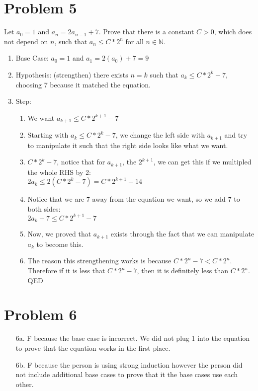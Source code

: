 \documentclass[11pt,letterpaper]{article}
\begin{document}
\section*{Problem 5}
Let $a_0 = 1$ and $a_n = 2a_{n-1} + 7$. Prove that there is a constant $C > 0$, which does not depend on $n$, such that $a_n \leq C * 2^n$ for all $n \in \mathbb{N}$.
\begin{enumerate}
	\item Base Case: $a_0 = 1$ and $a_1 = 2(a_0) + 7 = 9$
	\item Hypothesis: (strengthen) there exists $n = k$ such that $a_k \leq C * 2^k - 7$, choosing 7 because it matched the equation. 
	\item Step: 
	\begin{enumerate}
		\item We want $a_{k+1} \leq C * 2^{k+1} - 7$
		\item Starting with $a_k \leq C * 2^k - 7$, we change the left side with $a_{k+1}$ and try to manipulate it such that the right side looks like what we want.
		\item $C * 2^{k} - 7$, notice that for $a_{k+1}$, the $2^{k+1}$, we can get this if we multipled the whole RHS by 2: 
		\\ $2a_k \leq 2(C * 2^k - 7) = C * 2^{k+1} - 14 $
		\item Notice that we are 7 away from the equation we want, so we add 7 to both sides:
		\\ $2a_k + 7 \leq C * 2^{k+1} - 7 $
		\item Now, we proved that $a_{k+1}$ exists through the fact that we can manipulate $a_k$ to become this. 
		\item The reason this strengthening works is because $C * 2^n - 7 < C * 2^n$. Therefore if it is less that $C * 2^n - 7$, then it is definitely less than $C * 2^n$. QED
	\end{enumerate}	 
\end{enumerate}

\newpage

\section*{Problem 6}
\begin{enumerate}
	\item[6a.] F because the base case is incorrect. We did not plug 1 into the equation to prove that the equation works in the first place.
	\item[6b.] F because the person is using strong induction however the person did not include additional base cases to prove that it the base cases use each other. 
\end{enumerate}
\end{document}
